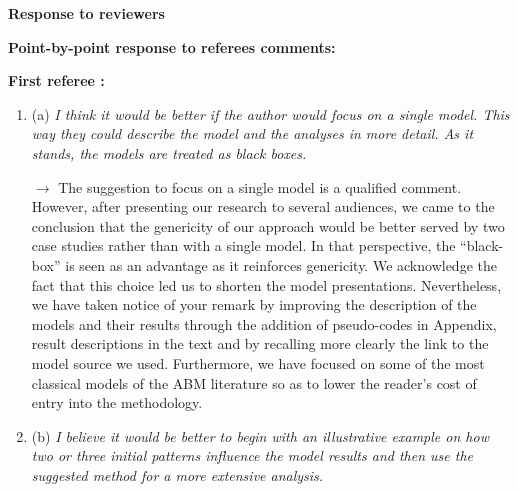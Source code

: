\documentclass[11pt,a4paper,sans]{moderncv}        %
\begin{document}
\textbf{Response to reviewers}


\bigskip



\textbf{Point-by-point response to referees comments:}

\medskip


\textbf{First referee :}

\medskip


\begin{enumerate}
	\item (a) \textit{I think it would be better if the author would focus on a single model. This way they could describe the model and the analyses in more detail. As it stands, the models are treated as black boxes.}
	
	\medskip
	
	$\rightarrow$ The suggestion to focus on a single model is a qualified comment. However, after presenting our research to several audiences, we came to the conclusion that the genericity of our approach would be better served by two case studies rather than with a single model. In that perspective, the ``black-box'' is seen as an advantage as it reinforces genericity. We acknowledge the fact that this choice led us to shorten the model presentations. Nevertheless, we have taken notice of your remark by improving the description of the models and their results through the addition of pseudo-codes in Appendix, result descriptions in the text and by recalling more clearly the link to the model source we used. Furthermore, we have focused on some of the most classical models of the ABM literature so as to lower the reader's cost of entry into the methodology.
	\bigskip
   
    \setcounter{enumi}{0}
   \item (b) \textit{I believe it would be better to begin with an illustrative example on how two or three initial patterns influence the model results and then use the suggested method for a more extensive analysis.}
   
   \medskip
   

\end{enumerate}
\end{document}
